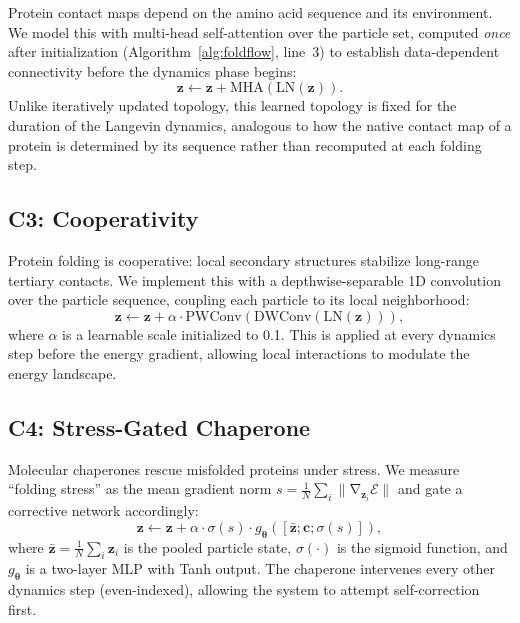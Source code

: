 \documentclass[10pt]{article}
\newcommand{\E}{\mathcal{E}}
\newcommand{\bz}{\mathbf{z}}
\newcommand{\bc}{\mathbf{c}}
\newcommand{\btheta}{\boldsymbol{\theta}}
\DeclareMathOperator{\grad}{\nabla}
\begin{document}
Protein contact maps depend on the amino acid sequence and its
environment.  We model this with multi-head self-attention over the
particle set, computed \emph{once} after initialization
(Algorithm~\ref{alg:foldflow}, line~3) to establish data-dependent
connectivity before the dynamics phase begins:
\begin{equation}
  \bz \leftarrow \bz + \text{MHA}(\text{LN}(\bz)).
\end{equation}
Unlike iteratively updated topology, this learned topology is fixed
for the duration of the Langevin dynamics, analogous to how the
native contact map of a protein is determined by its sequence rather
than recomputed at each folding step.

\subsection{C3: Cooperativity}
\label{sec:c3}

Protein folding is cooperative: local secondary structures stabilize
long-range tertiary contacts.  We implement this with a depthwise-separable
1D convolution over the particle sequence, coupling each particle to its
local neighborhood:
\begin{equation}
  \bz \leftarrow \bz + \alpha \cdot \text{PWConv}(\text{DWConv}(\text{LN}(\bz))),
\end{equation}
where $\alpha$ is a learnable scale initialized to 0.1.  This is applied
at every dynamics step before the energy gradient, allowing local
interactions to modulate the energy landscape.

\subsection{C4: Stress-Gated Chaperone}
\label{sec:c4}

Molecular chaperones rescue misfolded proteins under stress.  We measure
``folding stress'' as the mean gradient norm
$s = \frac{1}{N}\sum_i \|\grad_{\bz_i}\E\|$ and gate a corrective
network accordingly:
\begin{equation}
  \bz \leftarrow \bz + \alpha \cdot \sigma(s)
    \cdot g_\btheta([\bar{\bz}; \bc; \sigma(s)]),
\end{equation}
where $\bar{\bz} = \frac{1}{N}\sum_i \bz_i$ is the pooled particle
state, $\sigma(\cdot)$ is the sigmoid function, and $g_\btheta$ is a
two-layer MLP with Tanh output.  The chaperone intervenes every other
dynamics step (even-indexed), allowing the system to attempt
self-correction first.
\end{document}
